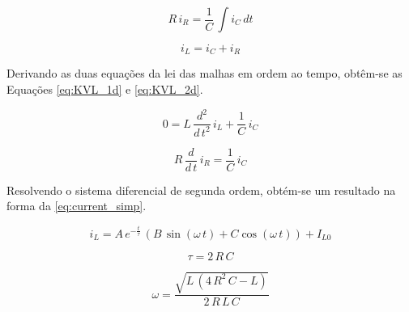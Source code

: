 \documentclass[a4paper,11pt]{article}
\numberwithin{equation}{section}
\begin{document}
\begin{equation}
\label{eq:KVL_2}
R\,i_R = \frac{1}{C}\,\int i_C\,dt
\end{equation}

\begin{equation}
\label{eq:KCL_1}
i_L = i_C + i_R
\end{equation}

Derivando as duas equações da lei das malhas em ordem ao tempo, obtêm-se as Equações \ref{eq:KVL_1d} e \ref{eq:KVL_2d}.

\begin{equation}
\label{eq:KVL_1d}
0 = L\,\frac{d^2}{d\,t^2}\,i_L + \frac{1}{C}\,i_C
\end{equation}

\begin{equation}
\label{eq:KVL_2d}
R\,\frac{d}{d\,t}\,i_R = \frac{1}{C}\,i_C
\end{equation}

Resolvendo o sistema diferencial de segunda ordem, obtém-se um resultado na forma da \autoref{eq:current_simp}.

\begin{equation}
\label{eq:current_simp}
i_L = A\, e^{-\frac{t}{\tau}}\,(B\,\sin{(\omega\,t)}+C\cos{(\omega\,t)}) + I_{L0}
\end{equation}

\begin{equation}
\label{eq:time_constant}
\tau = 2\,R\,C
\end{equation}

\begin{equation}
\label{eq:freq}
\omega = \frac{\sqrt{L\,(4\,R^2\,C-L)}}{2\,R\,L\,C}
\end{equation}


\end{document}
